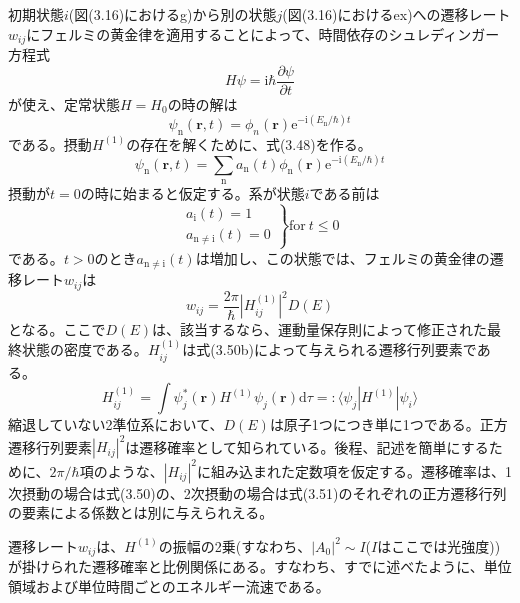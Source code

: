 \documentclass[11pt,a4j,uplatex]{jsarticle}
\begin{document}
初期状態$i$(図(3.16)におけるg)から別の状態$j$(図(3.16)におけるex)への遷移レート$w_{ij}$にフェルミの黄金律を適用することによって、時間依存のシュレディンガー方程式
\begin{equation}
  H\psi=\mathrm{i}\hbar\frac{\partial\psi}{\partial t}\tag{3.47a}
\end{equation}
が使え、定常状態$H=H_0$の時の解は
\begin{equation}
  \psi_{\mathrm{n}}(\bm{r},t)=\phi_{n}(\bm{r})\mathrm{e}^{-\mathrm{i}(E_{\mathrm{n}}/\hbar)t}\tag{3.47b}
\end{equation}
である。摂動$H^{(1)}$の存在を解くために、式(3.48)を作る。
\begin{equation}
  \psi_{\mathrm{n}}(\bm{r},t)=\sum_{\mathrm{n}}a_{\mathrm{n}}(t)\phi_{\mathrm{n}}(\bm{r})\mathrm{e}^{-\mathrm{i}(E_{\mathrm{n}}/\hbar)t}\tag{3.48}
\end{equation}
摂動が$t=0$の時に始まると仮定する。系が状態$i$である前は
\begin{equation}
\left.
\begin{array}{ccc}
a_{\mathrm{i}}(t)=1\\
a_{\mathrm{n\not=i}}(t)=0
\end{array}
\right\}  \mathrm{for}\:t\leq0\tag{3.49}
\end{equation}
である。$t>0$のとき$a_{\mathrm{n\not=i}}(t)$は増加し、この状態では、フェルミの黄金律の遷移レート$w_{ij}$は
\begin{equation}
  w_{ij}=\frac{2\pi}{\hbar}\left|H_{ij}^{(1)}\right|^2D(E)\tag{3.50a}
\end{equation}
となる。ここで$D(E)$は、該当するなら、運動量保存則によって修正された最終状態の密度である。$H_{ij}^{(1)}$は式(3.50b)によって与えられる遷移行列要素である。
\begin{equation}
  H_{ij}^{(1)}=\int\psi_j^*(\bm{r})H^{(1)}\psi_j(\bm{r})\mathrm{d}\tau=:\langle\psi_j\left|H^{(1)}\right|\psi_i\rangle\tag{3.50b}
\end{equation}
縮退していない2準位系において、$D(E)$は原子1つにつき単に1つである。正方遷移行列要素$\left|H_{ij}\right|^2$は遷移確率として知られている。後程、記述を簡単にするために、$2\pi/\hbar$項のような、$\left|H_{ij}\right|^2$に組み込まれた定数項を仮定する。遷移確率は、1次摂動の場合は式(3.50)の、2次摂動の場合は式(3.51)のそれぞれの正方遷移行列の要素による係数とは別に与えられえる。

遷移レート$w_{ij}$は、$H^{(1)}$の振幅の2乗(すなわち、$\left|A_0\right|^2\sim I$($I$はここでは光強度))が掛けられた遷移確率と比例関係にある。すなわち、すでに述べたように、単位領域および単位時間ごとのエネルギー流速である。%
\end{document}
